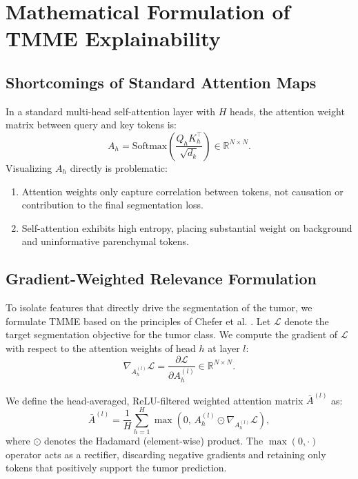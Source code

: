 \documentclass[journal,10pt,twocolumn]{IEEEtran}
\begin{document}
\section{Mathematical Formulation of TMME Explainability}
\label{sec:tmme}

\subsection{Shortcomings of Standard Attention Maps}
In a standard multi-head self-attention layer with $H$ heads, the attention weight matrix between query and key tokens is:
\begin{equation}
    A_h = \text{Softmax}\left( \frac{Q_h K_h^\top}{\sqrt{d_k}} \right) \in \mathbb{R}^{N \times N}.
\end{equation}
Visualizing $A_h$ directly is problematic:
\begin{enumerate}
    \item Attention weights only capture correlation between tokens, not causation or contribution to the final segmentation loss.
    \item Self-attention exhibits high entropy, placing substantial weight on background and uninformative parenchymal tokens.
\end{enumerate}

\subsection{Gradient-Weighted Relevance Formulation}
To isolate features that directly drive the segmentation of the tumor, we formulate TMME based on the principles of Chefer et al. \cite{chefer2021transformer,chefer2021generic}. Let $\mathcal{L}$ denote the target segmentation objective for the tumor class. We compute the gradient of $\mathcal{L}$ with respect to the attention weights of head $h$ at layer $l$:
\begin{equation}
    \nabla_{A_h^{(l)}} \mathcal{L} = \frac{\partial \mathcal{L}}{\partial A_h^{(l)}} \in \mathbb{R}^{N \times N}.
\end{equation}

We define the head-averaged, ReLU-filtered weighted attention matrix $\bar{A}^{(l)}$ as:
\begin{equation}
    \bar{A}^{(l)} = \frac{1}{H} \sum_{h=1}^H \max\left( 0, \, A_h^{(l)} \odot \nabla_{A_h^{(l)}} \mathcal{L} \right),
    \label{eq:weighted_attn}
\end{equation}
where $\odot$ denotes the Hadamard (element-wise) product. The $\max(0, \cdot)$ operator acts as a rectifier, discarding negative gradients and retaining only tokens that positively support the tumor prediction.
\end{document}
